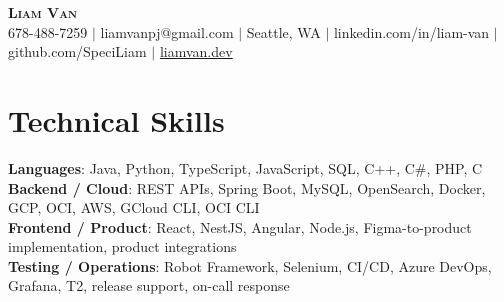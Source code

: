 \documentclass[letterpaper,11pt]{article}
\begin{document}

%
\begin{center}
    \textbf{\Huge \scshape Liam Van} \\ \vspace{1pt}
    \small 678-488-7259 $|$ liamvanpj@gmail.com $|$ Seattle, WA $|$
    linkedin.com/in/liam-van $|$ github.com/SpeciLiam $|$ \href{https://liamvan.dev}{liamvan.dev}

\end{center}

\section{Technical Skills}
 \begin{itemize}[leftmargin=0.15in, label={}]
    \small{\item{
     \textbf{Languages}{: Java, Python, TypeScript, JavaScript, SQL, C++, C\#, PHP, C} \\
     \textbf{Backend / Cloud}{: REST APIs, Spring Boot, MySQL, OpenSearch, Docker, GCP, OCI, AWS, GCloud CLI, OCI CLI} \\
     \textbf{Frontend / Product}{: React, NestJS, Angular, Node.js, Figma-to-product implementation, product integrations} \\
     \textbf{Testing / Operations}{: Robot Framework, Selenium, CI/CD, Azure DevOps, Grafana, T2, release support, on-call response} \\
    }}
 \end{itemize}
%

\end{document}
